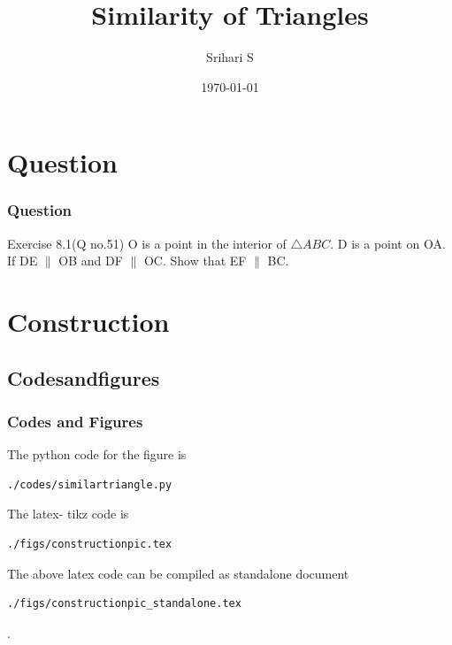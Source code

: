 \documentclass{beamer}
\title{Similarity of Triangles}
\author{Srihari S}
\institute{College of Engineering - Guindy}
\date{\today}
\begin{document}
\begin{frame}
\titlepage
\end{frame}
\section{Question}
\begin{frame}
\frametitle{Question}
\begin{block}{Exercise 8.1(Q no.51)}
O is a point in the interior of $\triangle ABC$. D is a point on OA. If DE $\parallel$ OB and DF $\parallel$ OC. Show that EF $\parallel$ BC.

\end{block}
\end{frame}

\section{\textbf{Construction}}
\subsection*{Codesandfigures}
\begin{frame}[fragile]
\frametitle{Codes and Figures}
\tiny
\begin{flushleft}
The python code for the figure is
\begin{lstlisting}
./codes/similartriangle.py
\end{lstlisting}
The latex- tikz code is
\begin{lstlisting}
./figs/constructionpic.tex
\end{lstlisting}
The above latex code can be compiled as standalone document
\begin{lstlisting} 
./figs/constructionpic_standalone.tex
\end{lstlisting}
\end{flushleft}.

\end{frame}
\end{document}

